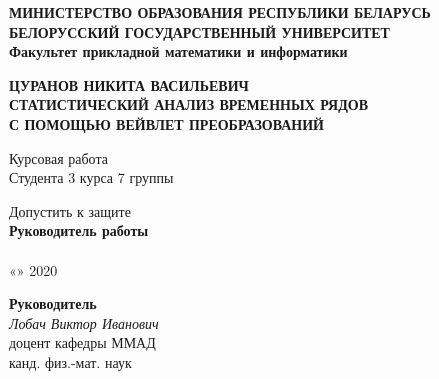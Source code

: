 \documentclass[a4paper]{article}
\begin{document}
	\begin{center}
		\textbf{
			МИНИСТЕРСТВО ОБРАЗОВАНИЯ РЕСПУБЛИКИ БЕЛАРУСЬ \\
			БЕЛОРУССКИЙ ГОСУДАРСТВЕННЫЙ УНИВЕРСИТЕТ \\
			Факультет прикладной математики и информатики
		} \\
		
		\vspace{1em}
		
	\end{center}
	
		\vspace{10em}
		
	\begin{center}
		\textbf{
			ЦУРАНОВ НИКИТА ВАСИЛЬЕВИЧ \\
			\vspace{1em}
			СТАТИСТИЧЕСКИЙ АНАЛИЗ ВРЕМЕННЫХ РЯДОВ \\
			С ПОМОЩЬЮ ВЕЙВЛЕТ ПРЕОБРАЗОВАНИЙ
		}
		
		\vspace{3em}
		Курсовая работа \\
		Студента 3 курса 7 группы
		
	\end{center}
	
	\vspace{10em}
	
	\begin{minipage}{0.4\textwidth}
		\begin{center}
			Допустить к защите \\
			\textbf{Руководитель работы} \\
			\underline{
				\qquad\qquad\qquad
				\qquad\qquad\quad
			} \\
			«\qquad»\underline{\qquad\qquad\qquad} 2020
		\end{center}
	\end{minipage}
	\hfill
	\begin{minipage}{0.4\textwidth}
		\begin{center}
			\textbf{Руководитель} \\
			\textit{Лобач Виктор Иванович} \\ 
			доцент кафедры ММАД \\ 
			канд. физ.-мат. наук
		\end{center}
	\end{minipage}
	
\end{document}
